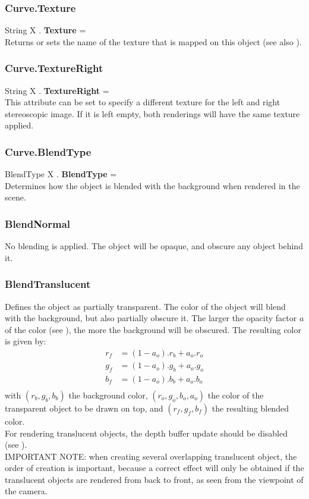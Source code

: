 \subsubsection{Curve.Texture \label{F:Curve:Texture}}
String X . \textbf{Texture} = \\
Returns or sets the name of the texture that is mapped on this object (see also ).

\subsubsection{Curve.TextureRight \label{F:Curve:TextureRight}}
String X . \textbf{TextureRight} = \\
This attribute can be set to specify a different texture for the left and right stereoscopic image. If it is left empty, both renderings will have the same texture applied.

\subsubsection{Curve.BlendType \label{F:Curve:BlendType}}
BlendType X . \textbf{BlendType} = \\
Determines how the object is blended with the background when rendered in the scene.

\subsubsection{BlendNormal \label{T:BlendType|BlendNormal}}
No blending is applied. The object will be opaque, and obscure any object behind it.

\subsubsection{BlendTranslucent \label{T:BlendType|BlendTranslucent}}
Defines the object as partially transparent. The color of the object will blend with the background, but also partially obscure it. The larger the opacity factor $a$ of the color (see ), the more the background will be obscured. The resulting color is given by:
\begin{equation}
\begin{array}{rcl}
r_f & = (1-a_o) . r_b + a_o . r_o \\
g_f & = (1-a_o) . g_b + a_o . g_o \\
b_f & = (1-a_o) . b_b + a_o . b_o \\
\end{array}
\end{equation}
with $(r_b,g_b,b_b)$ the background color, $(r_o,g_o,b_o,a_o)$ the color of the transparent object to be drawn on top, and $(r_f,g_f,b_f)$ the resulting blended color. \\
For rendering translucent objects, the depth buffer update should be disabled (see ). \\
IMPORTANT NOTE: when creating several overlapping translucent object, the order of creation is important, because a correct effect will only be obtained if the translucent objects are rendered from back to front, as seen from the viewpoint of the camera.

